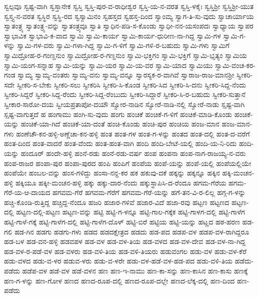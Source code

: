 ಸ್ವಲ್ಪವೂ
ಸ್ವಷ್ಟ-ವಾಗಿ
ಸ್ವಸ್ತಾನೇಕ
ಸ್ವಸ್ತಿ
ಸ್ವಸ್ತಿ-ಪುರ-ವ-ರಾಧೀಶ್ವರ
ಸ್ವಸ್ತಿ-ಯ-ನ-ವರತ
ಸ್ವಸ್ತಿ-ಳಕೈಃ
ಸ್ವಸ್ತಿಶ್ರೀ
ಸ್ವಸ್ತಿಶ್ರೀ-ಯುತ
ಸ್ವಸ್ತ್ಯ-ನ-ವರತ
ಸ್ವಸ್ಥಿರ
ಸ್ವಸ್ಥಿ-ರದ
ಸ್ವಸ್ವಾಮಿನಂ
ಸ್ವಹಸ್ತದ
ಸ್ವಹಸ್ತ-ದಿಂದ
ಸ್ವಾಂಮ್ಯ
ಸ್ವಾಗ-ತಿ-ಸು-ವುದು
ಸ್ವಾಚಾರ್ಯಾಯ
ಸ್ವಾತಂತ್ರ್ಯ
ಸ್ವಾತಂತ್ರ್ಯ-ವನ್ನು
ಸ್ವಾತಂತ್ರ್ಯವೂ
ಸ್ವಾತಿ
ಸ್ವಾಧಿನ-ಪಡಿ-ಸ-ಕೊಂಡು
ಸ್ವಾಧೀ-ನನ-ಯಸಂಪದಃ
ಸ್ವಾಧ್ಯಾಯ
ಸ್ವಾಪರ
ಸ್ವಾಭಾವಿಕ
ಸ್ವಾಭಾವಿ-ಕ-ವಾದ
ಸ್ವಾಮಿ
ಸ್ವಾಮಿ-ಕಾರ್ಯ
ಸ್ವಾಮಿ-ಕಾರ್ಯ-ಧುರೀಣ-ನಾ-ಗಿದ್ದ
ಸ್ವಾಮಿ-ಗಳ
ಸ್ವಾಮಿ-ಗ-ಳನ್ನು
ಸ್ವಾಮಿ-ಗಳ-ವರು
ಸ್ವಾಮಿ-ಗಳಾ-ಗಿದ್ದ
ಸ್ವಾಮಿ-ಗ-ಳಿಗೆ
ಸ್ವಾಮಿ-ಗಳಿ-ರ-ಬಹುದು
ಸ್ವಾಮಿ-ಗಳು
ಸ್ವಾಮಿಗೆ
ಸ್ವಾಮಿದ್ರೋಹ-ರ-ಗಂಣ್ಡನುಂ
ಸ್ವಾಮಿದ್ರೋಹ-ರ-ಗಣ್ಡನುಂ
ಸ್ವಾಮಿ-ಭಕ್ತಿಗಂ
ಸ್ವಾಮಿ-ಭಕ್ತಿಗೆ
ಸ್ವಾಮಿ-ಭೃತ್ಯಂ
ಸ್ವಾಮಿಯ
ಸ್ವಾಮಿ-ಯಂಗ-ಸನ್ನಾಹ
ಸ್ವಾಮಿ-ಯನ್ನು
ಸ್ವಾಮಿ-ಯರ
ಸ್ವಾಮಿ-ಯ-ವರ
ಸ್ವಾಮಿ-ಯಾದ
ಸ್ವಾಮಿಯು
ಸ್ವಾಮಿ-ವಂಚ-ಕರ-ಗಂಡ
ಸ್ವಾಮ್ಯ
ಸ್ವಾಮ್ಯ-ವಂತರು
ಸ್ವಾಮ್ಯ-ವನು
ಸ್ವಾಮ್ಯ-ವನ್ನೂ
ಸ್ವಾರಸ್ಯಕ-ರ-ವಾಗಿವೆ
ಸ್ವಾರಾಜ-ರಾಜ-ಮಾನಶ್ರೀ
ಸ್ವೀಕರಿ-ಸದೇ
ಸ್ವೀಕರಿ-ಸ-ಬೇಕು
ಸ್ವೀಕರಿ-ಸಲು
ಸ್ವೀಕರಿಸಿ
ಸ್ವೀಕರಿ-ಸಿ-ಕೊಂಡ
ಸ್ವೀಕರಿ-ಸಿದ
ಸ್ವೀಕರಿ-ಸಿ-ದನು
ಸ್ವೀಕರಿ-ಸಿದ್ದ-ನೆಂದು
ಸ್ವೀಕರಿ-ಸಿದ್ದರೆ
ಸ್ವೀಕರಿ-ಸಿದ್ದ-ರೆಂದು
ಸ್ವೀಕರಿ-ಸಿದ್ದ-ರೆಂಬುದು
ಸ್ವೀಕರಿ-ಸಿದ್ದಾರೆ
ಸ್ವೀಕರಿ-ಸಿ-ರ-ಬಹುದು
ಸ್ವೀಕರಿ-ಸುತ್ತಾನೆ
ಸ್ವೀಕಾರ-ಸಾರೋ-ದಯ
ಸ್ವೀಯಪ್ರತಾಪೋ-ದಯೌ
ಸ್ವೋರ-ನಾಡಿನ
ಸ್ವೋರೆ-ನಾಡಿ-ನಲ್ಲಿ
ಸ್ವೋರೆ-ನಾಡು
ಸ್ಷಷ್ಟ-ವಾಗಿ
ಸ್ಷಷ್ಟ-ವಾಗುತ್ತದೆ
ಹ
ಹಂಗಾಮು
ಹಂಗಿ-ಸು-ವುದು
ಹಂಗು
ಹಂಚಿಕೆ
ಹಂಚಿಕೆ-ಗ-ಳಿಗೆ
ಹಂಚಿಕೆ-ಮಾಡಿ-ಕೊಂಡು
ಹಂಚಿಕೆ-ಯನ್ನು
ಹಂಚಿಕೆ-ಯಾ-ಗಿದೆ
ಹಂಚಿಕೆ-ಯಾ-ದಂತೆ
ಹಂಚಿ-ಕೊಂಡು
ಹಂಚಿ-ಪುರ
ಹಂಚಿಯ
ಹಂಜ-ಮಾನ
ಹಂಜ-ಮಾನ-ಗಳು
ಹಂಣೆಚೌ-ಕನ-ಹಳ್ಳಿ-ಅಣ್ಣೆಚಾ-ಕನ-ಹಳ್ಳಿ
ಹಂತ
ಹಂತ-ಗಳ
ಹಂತ-ಗ-ಳನ್ನು
ಹಂತದ
ಹಂತ-ದಲ್ಲಿ
ಹಂತ-ದ-ವರೆಗೆ
ಹಂತ-ದಿಂದ
ಹಂತ-ವಾದರೆ
ಹಂತ-ವೆಂದು
ಹಂತ-ಹಂತ-ವಾಗಿ
ಹಂದಿ
ಹಂದಿ-ಬೇಟೆ-ಯಲ್ಲಿ
ಹಂದಿ-ಯ-ನಿ-ರಿದು
ಹಂದಿ-ಯನ್ನು
ಹಂದೂರ್
ಹಂದೇ-ಹಳ್ಳಿ
ಹಂನೆ-ರಡು
ಹಂನೆ-ರಡು-ವರ್ಷ
ಹಂಪ
ಹಂಪನಾ
ಹಂಪ-ನಾಗ-ರಾಜಯ್ಯ-ನ-ವರು
ಹಂಪ-ರಾಜರ
ಹಂಪಾ-ಪುರ
ಹಂಪಾ-ಪುರದ
ಹಂಪಿ
ಹಂಪಿಗೆ
ಹಂಪೆಯ
ಹಂಪೆ-ಯನ್ನು
ಹಂಪೆ-ಯಲ್ಲಿ
ಹಂಪೆಯಲ್ಲಿಯೇ
ಹಂಪೆಯೇ
ಹಂಬಲ-ವನ್ನು
ಹಂಸ-ಗಳಿದ್ದು
ಹಂಸಾ-ನನ್ದ-ಕರ
ಹಕ
ಹಕುವು-ದಕೆ
ಹಕ್ಕನ್ನು
ಹಕ್ಕನ್ನೂ
ಹಕ್ಕಿನ
ಹಕ್ಕಿ-ಮಂಚನ-ಹಳ್ಳಿ
ಹಕ್ಕಿಯೂ
ಹಕ್ಕೀ-ಮಂಚನ-ಹಳ್ಳಿ
ಹಕ್ಕು
ಹಕ್ಕು-ದಾರ-ನೆಂದು
ಹಕ್ಕುಸ್ಥಾಪಿಸಿ-ದ-ರೆಂದೂ
ಹಗಮ-ಗೆರೆಯ
ಹಗಮ-ಗೆರೆ-ಯ-ಆ-ದಾಯದ
ಹಗವಮ-ಗೆರೆ
ಹಗವಮ-ಗೆರೆಗೆ
ಹಗವಮ-ಗೆರೆ-ಯನ್ನು
ಹಗೆ-ತನ-ವಿ-ರ-ಲಿಲ್ಲ
ಹಗ್ಗ-ಗ-ಳನ್ನು
ಹಚ್ಚಿ-ಕೊಂಡಿ-ರುತ್ತಿದ್ದ
ಹಚ್ಚಿದ್ದ-ನೆಂದೂ
ಹಜರಿ
ಹಜಾರ-ಗಳಿವೆ
ಹಜಾರ-ವಿದೆ
ಹಜಾ-ರವು
ಹಟ್ಟಣ
ಹಟ್ಟಣದ
ಹಟ್ಟಣ-ದಲ್ಲಿ
ಹಟ್ಟಣ-ದಲ್ಲಿ-ಪಟ್ಟಣ
ಹಟ್ಟಣ-ವನ್ನು
ಹಟ್ಟಿ
ಹಟ್ಟಿ-ಗ-ಳನ್ನೂ
ಹಟ್ಟಿ-ಗಾಲ-ಗಕ್ಕೆಕ
ಹಟ್ಟಿ-ಗಾಳಗ-ದಲ್ಲಿ
ಹಟ್ಟಿ-ಗಾಳೆಗ
ಹಟ್ಟಿ-ಗಾಳೆ-ಗಕ್ಕೆ
ಹಟ್ಟಿ-ಗಾಳೆಗ-ದಲ್ಲಿ
ಹಟ್ಟಿ-ಗಾಳೆಗ-ದೊಳ್
ಹಟ್ಟಿ-ಬಿರೆ
ಹಟ್ಟಿಯ
ಹಟ್ಟಿ-ಯನ್ನು
ಹಟ್ಣದ
ಹಠ-ಹರಣ
ಹಡ-ಗಲಿ
ಹಡ-ಗಿನ
ಹಡಗು
ಹಡಗು-ಗಳು
ಹಡದ
ಹಡದಕ್ಷೇತ್ರದ
ಹಡದು
ಹಡ-ಪದ
ಹಡಪ-ವಳ
ಹಡಪ-ವಳ-ರಾಗಿದ್ದರೂ
ಹಡ-ಬಳ
ಹಡ-ವನ-ಹಳ್ಳಿ
ಹಡವಪಳ
ಹಡ-ವಳ
ಹಡ-ವಳ-ತಿಯ
ಹಡ-ವಳದ
ಹಡ-ವಳ-ದೇವ
ಹಡ-ವಳ-ನಾ-ಗಿದ್ದ
ಹಡ-ವಳ-ರ-ಪಡೆ-ವಳ
ಹಡ-ವಳರು
ಹಡ-ವಳಿ-ತಿಯ
ಹಡ-ವಳಿ-ತಿಯರು
ಹಡುವಂಗಲ
ಹಡು-ವಳ
ಹಡು-ವಳ-ಕೆರೆ
ಹಡು-ವಳದ
ಹಡು-ವ-ಳರ
ಹಡುವ-ಳರು
ಹಡು-ವ-ಳರೇ
ಹಡು-ವಳ-ಹಡೆ-ವಳ-ಹಡ-ಪದ
ಹಡು-ವಳಿ-ತಿಯ
ಹಡೆದು-ಪಡೆದು
ಹಡೆಪ-ವಳ
ಹಡೆ-ವಳ
ಹಡೆ-ವಳನ
ಹಣ
ಹಣ-ಇ-ನಾಮು
ಹಣ-ಕಾ-ಸನ್ನು
ಹಣ-ಕಾಸಿನ
ಹಣ-ಕಾಸು
ಹಣಕ್ಕೆ
ಹಣ-ಗ-ಳನ್ನು
ಹಣ-ಗೋಳ
ಹಣದ
ಹಣದ-ರೂಪ-ದಲ್ಲಿ
ಹಣದ-ರೂಪ-ದಲ್ಲೇ
ಹಣದ-ಲೆಕ್ಕ-ದಲ್ಲಿ
ಹಣ-ದಿಂದ
ಹಣ-ಪಡೆದು
